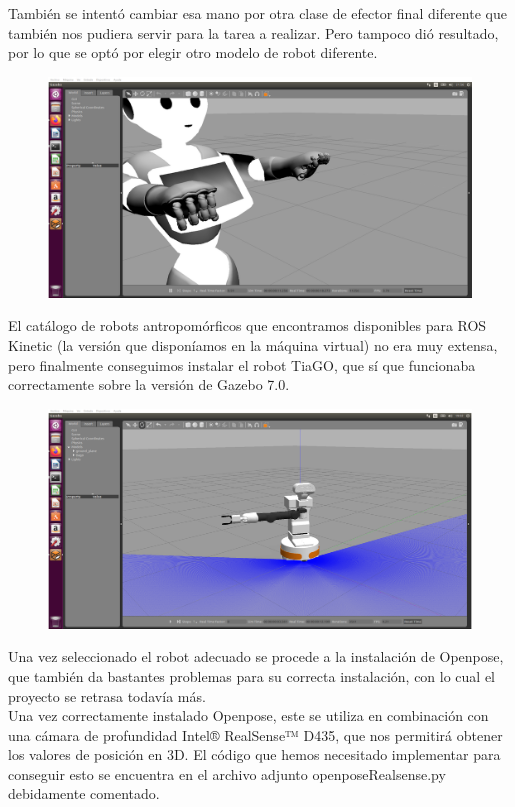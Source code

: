 También se intentó cambiar esa mano por otra clase de efector final diferente que también nos pudiera servir para la tarea a realizar. Pero tampoco dió resultado, por lo que se optó por elegir otro modelo de robot diferente.\\
\begin{figure}
  \includegraphics{images/peppermano.png}
\end{figure}
El catálogo de robots antropomórficos que encontramos disponibles para ROS Kinetic (la versión que disponíamos en la máquina virtual) no era muy extensa, pero finalmente conseguimos instalar el robot TiaGO, que sí que funcionaba correctamente sobre la versión de Gazebo 7.0.\\
\begin{figure}
  \includegraphics{images/tiago.png}
\end{figure}
Una vez seleccionado el robot adecuado se procede a la instalación de Openpose, que también da bastantes problemas para su correcta instalación, con lo cual el proyecto se retrasa todavía más.\\
Una vez correctamente instalado Openpose, este se utiliza en combinación con una cámara de profundidad Intel® RealSense™ D435, que nos permitirá obtener los valores de posición en 3D. El código que hemos necesitado implementar para conseguir esto se encuentra en el archivo adjunto openposeRealsense.py debidamente comentado.\\

